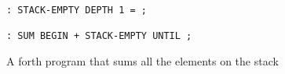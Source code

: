 \begin{figure}[htb]
    \centering
    \begin{lstlisting}
: STACK-EMPTY DEPTH 1 = ;

: SUM BEGIN + STACK-EMPTY UNTIL ;
\end{lstlisting}
    \caption{A forth program that sums all the elements on the stack}
    \label{fig:forth_example}
\end{figure}
